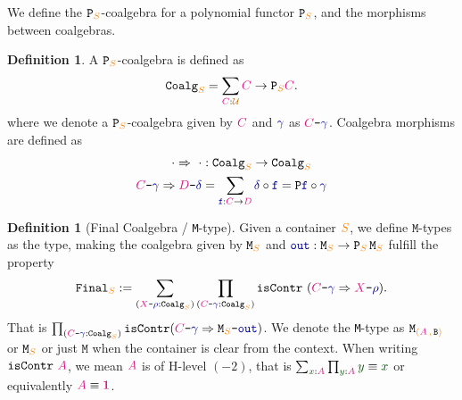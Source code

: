 \documentclass[twoside,11pt,openright]{report}
\theoremstyle{plain} %
\theoremstyle{definition}
\newtheorem{defn}[thm]{Definition}%
\theoremstyle{remark}
\newcommand*{\term}[1]{\textcolor{green!30!black}{#1}} %
\newcommand*{\type}[1]{\textcolor{magenta!90!black}{#1}}
\newcommand*{\container}[1]{\textcolor{orange}{#1}}
\newcommand*{\containerpair}[2]{\ensuremath{\colorlet{savedleftcolor}{.}\color{orange}\left(\color{savedleftcolor}#1\,\textcolor{orange}{\mathbf{,}}\,#2\color{orange}\right)\color{savedleftcolor}}}
\newcommand*{\universe}[1]{\textcolor{orange!80!black}{#1}}
\newcommand*{\unit}{\type{\textbf{1}}}
\newcommand*{\coalg}[2]{#1\texttt{-}#2}
\newcommand*{\function}[1]{\textcolor{blue!60!black}{\ensuremath{\mathtt{#1}}}}
\newcommand*{\typeformer}[1]{\ensuremath{\mathtt{#1}}}
\newcommand*{\functor}[1]{\ensuremath{\mathbf{\mathtt{#1}}}}
\begin{document}
\noindent We define the \(\functor{P}_{\container{S}}\)-coalgebra for a polynomial functor \(\functor{P}_{\container{S}}\), and the morphisms between coalgebras.
\begin{defn}
  A \(\functor{P}_{\container{S}}\)-coalgebra is defined as
  \begin{equation}
    \typeformer{Coalg}_{\container{S}} = \sum_{\type{C} : \universe{\mathcal{U}}} \type{C} \rightarrow \functor{P}_{\container{S}}\type{C}.
  \end{equation}
  where we denote a \(\functor{P}_{\container{S}}\)-coalgebra given by \(\type{C}\) and \(\function{\gamma}\) as \(\coalg{\type{C}}{\function{\gamma}}\). Coalgebra morphisms are defined as
  \begin{equation}
    \begin{aligned}
      \cdot \Rightarrow ~\cdot &: \typeformer{Coalg}_{\container{S}} \rightarrow \typeformer{Coalg}_{\container{S}} \\
      \coalg{\type{C}}{\function{\gamma}} \Rightarrow \coalg{\type{D}}{\function{\delta}} &= \sum_{\function{f} : \type{C} \rightarrow \type{D}} \function{\delta} \circ \function{f} = \functor{P} \function{f} \circ \function{\gamma}
    \end{aligned}
  \end{equation}
\end{defn}
\begin{defn}[Final Coalgebra / \texttt{M}-type]
  \label{defn:M-type-final-def}
  Given a container \(\container{S}\), we define \(\mathtt{M}\)-types as the type, making the coalgebra given by \(\typeformer{M}_{\container{S}}\) and \(\function{out} : \typeformer{M}_{\container{S}} \rightarrow \functor{P}_{\container{S}}\,\typeformer{M}_{\container{S}}\) fulfill the property
  \begin{equation}
    \typeformer{Final}_{\container{S}} := \sum_{(\coalg{\type{X}}{\function{\rho}} : \mathtt{Coalg}_{\container{S}})} \prod_{(\coalg{\type{C}}{\function{\gamma}} : \mathtt{Coalg}_{\container{S}})} \mathtt{isContr}~(\coalg{\type{C}}{\function{\gamma}} \Rightarrow \coalg{\type{X}}{\function{\rho}}).
  \end{equation}
  That is \(\prod_{(\coalg{\type{C}}{\function{\gamma}} : \mathtt{Coalg}_{\container{S}})} \mathtt{isContr}(\coalg{\type{C}}{\function{\gamma}} \Rightarrow \coalg{\typeformer{M}_{\container{S}}}{\function{out}})\). We denote the \texttt{M}-type as \(\typeformer{M}_{\containerpair{\type{A}}{\typeformer{B}}}\) or \(\typeformer{M}_{\container{S}}\) or just \(\typeformer{M}\) when the container is clear from the context. When writing \(\mathtt{isContr}~\type{A}\), we mean \(\type{A}\) is of H-level \((-2)\), that is \(\sum_{\term{x} : \type{A}} \prod_{\term{y} : \type{A}} \term{y} \equiv \term{x}\) or equivalently \(\type{A} \equiv \unit\).
\end{defn}
\end{document}
